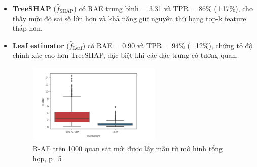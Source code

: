 \documentclass[12pt, a4paper]{article}
\begin{document}
        \begin{itemize}[align=parleft, left=4em, labelsep=1em, itemsep=0.5em]
            \item \textbf{TreeSHAP} ($\hat{f}_{\text{SHAP}}$) có RAE trung bình = 3.31 và TPR = 86\% (±17\%), cho thấy mức độ sai số lớn hơn và khả năng giữ nguyên thứ hạng top-k feature thấp hơn.  
    
            \item \textbf{Leaf estimator} ($\hat{f}_{\text{Leaf}}$) có RAE = 0.90 và TPR = 94\% (±12\%), chứng tỏ độ chính xác cao hơn TreeSHAP, đặc biệt khi các đặc trưng có tương quan.
    
            \begin{figure}[H]
                \centering
                \includegraphics[width=0.6\textwidth]{img/restult_experiment_1.png}
                \caption{R-AE trên 1000 quan sát mới được lấy mẫu từ mô hình tổng hợp, p=5}
            \end{figure}
     \end{itemize}
\end{document}
